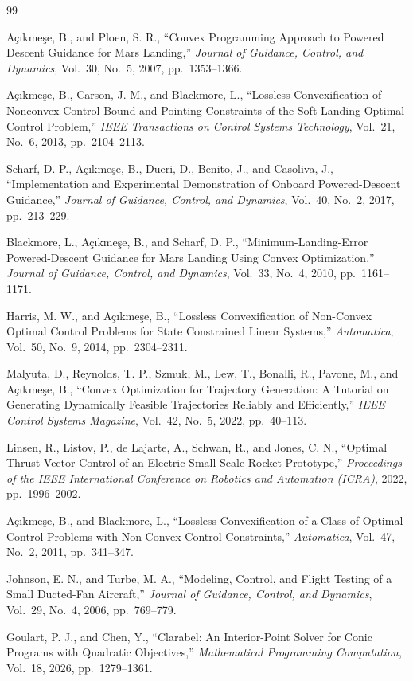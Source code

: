 \documentclass[10pt,letterpaper]{article}
\begin{document}
\setlength{\bibsep}{0pt}
\begin{thebibliography}{99}

A\c{c}{\i}kme\c{s}e, B., and Ploen, S. R., ``Convex Programming Approach to Powered Descent Guidance for Mars Landing,'' \textit{Journal of Guidance, Control, and Dynamics}, Vol.~30, No.~5, 2007, pp.~1353--1366.

A\c{c}{\i}kme\c{s}e, B., Carson, J. M., and Blackmore, L., ``Lossless Convexification of Nonconvex Control Bound and Pointing Constraints of the Soft Landing Optimal Control Problem,'' \textit{IEEE Transactions on Control Systems Technology}, Vol.~21, No.~6, 2013, pp.~2104--2113.

Scharf, D. P., A\c{c}{\i}kme\c{s}e, B., Dueri, D., Benito, J., and Casoliva, J., ``Implementation and Experimental Demonstration of Onboard Powered-Descent Guidance,'' \textit{Journal of Guidance, Control, and Dynamics}, Vol.~40, No.~2, 2017, pp.~213--229.

Blackmore, L., A\c{c}{\i}kme\c{s}e, B., and Scharf, D. P., ``Minimum-Landing-Error Powered-Descent Guidance for Mars Landing Using Convex Optimization,'' \textit{Journal of Guidance, Control, and Dynamics}, Vol.~33, No.~4, 2010, pp.~1161--1171.

Harris, M. W., and A\c{c}{\i}kme\c{s}e, B., ``Lossless Convexification of Non-Convex Optimal Control Problems for State Constrained Linear Systems,'' \textit{Automatica}, Vol.~50, No.~9, 2014, pp.~2304--2311.

Malyuta, D., Reynolds, T. P., Szmuk, M., Lew, T., Bonalli, R., Pavone, M., and A\c{c}{\i}kme\c{s}e, B., ``Convex Optimization for Trajectory Generation: A Tutorial on Generating Dynamically Feasible Trajectories Reliably and Efficiently,'' \textit{IEEE Control Systems Magazine}, Vol.~42, No.~5, 2022, pp.~40--113.

Linsen, R., Listov, P., de Lajarte, A., Schwan, R., and Jones, C. N., ``Optimal Thrust Vector Control of an Electric Small-Scale Rocket Prototype,'' \textit{Proceedings of the IEEE International Conference on Robotics and Automation (ICRA)}, 2022, pp.~1996--2002.

A\c{c}{\i}kme\c{s}e, B., and Blackmore, L., ``Lossless Convexification of a Class of Optimal Control Problems with Non-Convex Control Constraints,'' \textit{Automatica}, Vol.~47, No.~2, 2011, pp.~341--347.

Johnson, E. N., and Turbe, M. A., ``Modeling, Control, and Flight Testing of a Small Ducted-Fan Aircraft,'' \textit{Journal of Guidance, Control, and Dynamics}, Vol.~29, No.~4, 2006, pp.~769--779.

Goulart, P. J., and Chen, Y., ``Clarabel: An Interior-Point Solver for Conic Programs with Quadratic Objectives,'' \textit{Mathematical Programming Computation}, Vol.~18, 2026, pp.~1279--1361.

\end{thebibliography}
\end{document}
